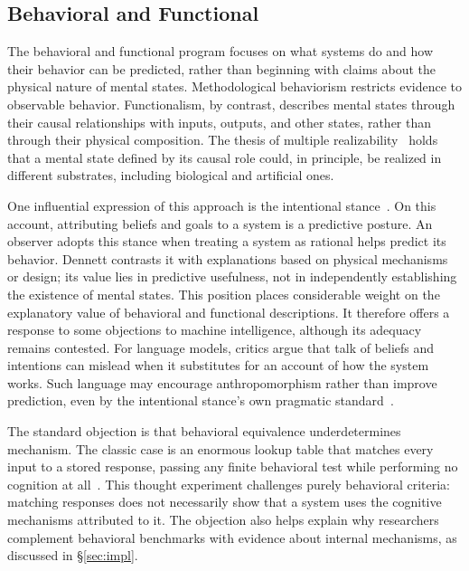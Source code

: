 \documentclass[acmsmall,screen,review,anonymous]{acmart}
\begin{document}
\subsection{Behavioral and Functional}
The behavioral and functional program focuses on what systems do and how their behavior can be predicted, rather than beginning with claims about the physical nature of mental states.
%
Methodological behaviorism restricts evidence to observable behavior.
%
Functionalism, by contrast, describes mental states through their causal relationships with inputs, outputs, and other states, rather than through their physical composition.
%
The thesis of multiple realizability~\citep{Putnam1978-PUTTNO-4} holds that a mental state defined by its causal role could, in principle, be realized in different substrates, including biological and artificial ones.

One influential expression of this approach is the intentional stance~\citep{dennett1987}.
%
On this account, attributing beliefs and goals to a system is a predictive posture.
%
An observer adopts this stance when treating a system as rational helps predict its behavior.
%
Dennett contrasts it with explanations based on physical mechanisms or design; its value lies in predictive usefulness, not in independently establishing the existence of mental states.
%
This position places considerable weight on the explanatory value of behavioral and functional descriptions.
%
It therefore offers a response to some objections to machine intelligence, although its adequacy remains contested.
%
For language models, critics argue that talk of beliefs and intentions can mislead when it substitutes for an account of how the system works.
%
Such language may encourage anthropomorphism rather than improve prediction, even by the intentional stance's own pragmatic standard~\citep{10.1145/3624724}.

The standard objection is that behavioral equivalence underdetermines mechanism.
%
The classic case is an enormous lookup table that matches every input to a stored response, passing any finite behavioral test while performing no cognition at all~\citep{Block1981PsychologismAB}.
%
This thought experiment challenges purely behavioral criteria: matching responses does not necessarily show that a system uses the cognitive mechanisms attributed to it.
%
The objection also helps explain why researchers complement behavioral benchmarks with evidence about internal mechanisms, as discussed in \S\ref{sec:impl}.
\end{document}
